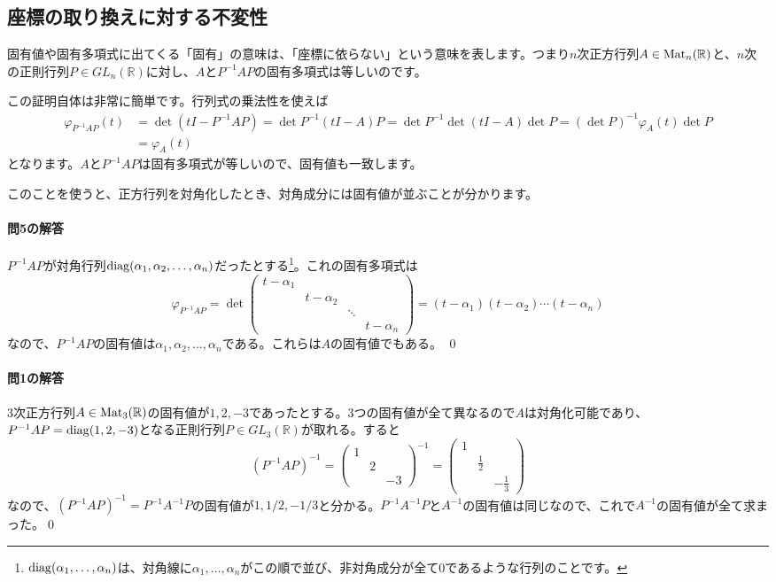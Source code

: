 \subsection{座標の取り換えに対する不変性}

固有値や固有多項式に出てくる「固有」の意味は、「座標に依らない」という意味を表します。つまり$n$次正方行列$A \in \operatorname{Mat}_n(\mathbb{R})$と、$n$次の正則行列$P \in GL_n(\mathbb{R})$に対し、$A$と$P^{-1} A P$の固有多項式は等しいのです。

この証明自体は非常に簡単です。行列式の乗法性を使えば
\begin{align*}
\varphi_{P^{-1} A P}(t)
&= \det(tI - P^{-1} A P) = \det P^{-1} (tI - A) P = \det P^{-1} \det (tI - A) \det P = (\det P)^{-1} \varphi_A(t) \det P \\
&= \varphi_A(t)
\end{align*}
となります。$A$と$P^{-1} A P$は固有多項式が等しいので、固有値も一致します。

このことを使うと、正方行列を対角化したとき、対角成分には固有値が並ぶことが分かります。

\paragraph{問5の解答}
$P^{-1} A P$が対角行列$\operatorname{diag}(\alpha_1, \alpha_2, \ldots, \alpha_n)$だったとする\footnote{$\operatorname{diag}(\alpha_1, \ldots, \alpha_n)$は、対角線に$\alpha_1, \ldots, \alpha_n$がこの順で並び、非対角成分が全て$0$であるような行列のことです。}。これの固有多項式は
\[
\varphi_{P^{-1} A P}
= \det
\begin{pmatrix}
t - \alpha_1 \\
& t - \alpha_2 \\
& & \ddots \\
& & & t - \alpha_n
\end{pmatrix}
= (t - \alpha_1) (t - \alpha_2) \cdots (t - \alpha_n)
\]
なので、$P^{-1} A P$の固有値は$\alpha_1, \alpha_2, \ldots, \alpha_n$である。これらは$A$の固有値でもある。 \qed

\paragraph{問1の解答}
$3$次正方行列$A \in \operatorname{Mat}_3(\mathbb{R})$の固有値が$1, 2, -3$であったとする。$3$つの固有値が全て異なるので$A$は対角化可能であり、$P^{-1} A P = \operatorname{diag}(1, 2, -3)$となる正則行列$P \in GL_3(\mathbb{R})$が取れる。すると
\[
(P^{-1} A P)^{-1}
=
\begin{pmatrix}
1 \\
& 2 \\
& & -3
\end{pmatrix}^{-1}
=
\begin{pmatrix}
1 \\
& \frac{1}{2} \\
& & -\frac{1}{3}
\end{pmatrix}
\]
なので、$(P^{-1} A P)^{-1} = P^{-1} A^{-1} P$の固有値が$1, 1/2, -1/3$と分かる。$P^{-1} A^{-1} P$と$A^{-1}$の固有値は同じなので、これで$A^{-1}$の固有値が全て求まった。\qed

